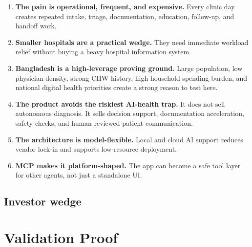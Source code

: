 \documentclass[11pt,letterpaper]{article}
\begin{document}
\begin{enumerate}
  \item \textbf{The pain is operational, frequent, and expensive.} Every clinic day creates repeated intake, triage, documentation, education, follow-up, and handoff work.
  \item \textbf{Smaller hospitals are a practical wedge.} They need immediate workload relief without buying a heavy hospital information system.
  \item \textbf{Bangladesh is a high-leverage proving ground.} Large population, low physician density, strong CHW history, high household spending burden, and national digital health priorities create a strong reason to test here.
  \item \textbf{The product avoids the riskiest AI-health trap.} It does not sell autonomous diagnosis. It sells decision support, documentation acceleration, safety checks, and human-reviewed patient communication.
  \item \textbf{The architecture is model-flexible.} Local and cloud AI support reduces vendor lock-in and supports low-resource deployment.
  \item \textbf{MCP makes it platform-shaped.} The app can become a safe tool layer for other agents, not just a standalone UI.
\end{enumerate}

\subsection{Investor wedge}

\begin{center}
\end{center}

\section{Validation Proof}
\end{document}
